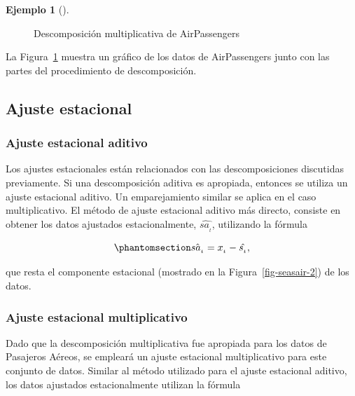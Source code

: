 \documentclass[
  us-letterpaper,
]{scrreprt}
\theoremstyle{plain}
\theoremstyle{definition}
\newtheorem{example}{Ejemplo}[chapter]
\theoremstyle{plain}
\theoremstyle{definition}
\theoremstyle{remark}
\begin{document}
\begin{example}[]
\begin{tcolorbox}
\begin{enumerate}
\begin{figure}[H]
{  }

  \caption{\label{fig-descmul}Descomposición multiplicativa de
  AirPassengers}

  \end{figure}%
\end{enumerate}

La Figura~\ref{fig-descmul} muestra un gráfico de los datos de
AirPassengers junto con las partes del procedimiento de descomposición.

\end{tcolorbox}

\end{example}

\subsection{Ajuste estacional}\label{ajuste-estacional}

\subsubsection{Ajuste estacional
aditivo}\label{ajuste-estacional-aditivo}

Los ajustes estacionales están relacionados con las descomposiciones
discutidas previamente. Si una descomposición aditiva es apropiada,
entonces se utiliza un ajuste estacional aditivo. Un emparejamiento
similar se aplica en el caso multiplicativo. El método de ajuste
estacional aditivo más directo, consiste en obtener los datos ajustados
estacionalmente, \(\hat{sa_{_t}}\), utilizando la fórmula

\begin{equation}\phantomsection\label{eq-AEadd}{
\hat{sa_{_t}}=x_{_t}-\hat{s_{_t}},
}\end{equation}

que resta el componente estacional (mostrado en la
Figura~\ref{fig-seasair-2}) de los datos.

\subsubsection{Ajuste estacional
multiplicativo}\label{ajuste-estacional-multiplicativo}

Dado que la descomposición multiplicativa fue apropiada para los datos
de Pasajeros Aéreos, se empleará un ajuste estacional multiplicativo
para este conjunto de datos. Similar al método utilizado para el ajuste
estacional aditivo, los datos ajustados estacionalmente utilizan la
fórmula
\end{document}
